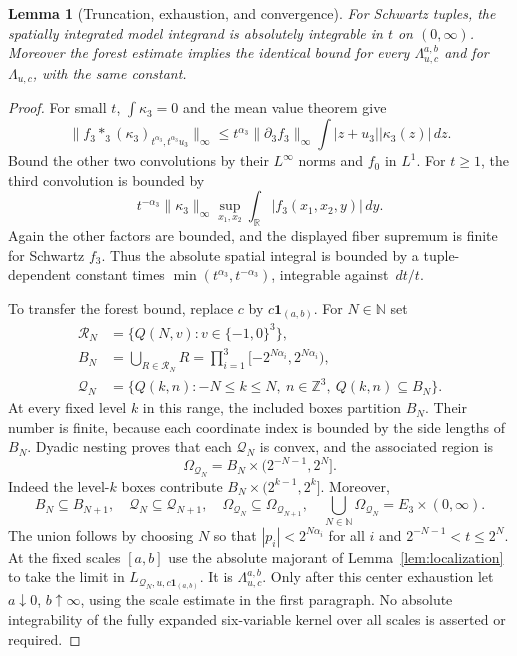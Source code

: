 \documentclass[12pt,reqno]{amsart}
\theoremstyle{plain}
\newtheorem{lemma}[theorem]{Lemma}
\theoremstyle{definition}
\theoremstyle{remark}
\numberwithin{equation}{section}
\newcommand{\R}{\mathbb R}
\newcommand{\N}{\mathbb N}
\newcommand{\Z}{\mathbb Z}
\newcommand{\dd}{\,d}
\newcommand{\one}{\mathbf 1}
\begin{document}
\begin{lemma}[Truncation, exhaustion, and convergence]\label{lem:model_convergence}
For Schwartz tuples, the spatially integrated model integrand is
absolutely integrable in $t$ on $(0,\infty)$. Moreover the forest
estimate implies the identical bound for every $\Lambda^{a,b}_{u,c}$
and for $\Lambda_{u,c}$, with the same constant.
\end{lemma}
\begin{proof}
For small $t$, $\int\kappa_3=0$ and the mean value theorem give
\[
 \|f_3*_3(\kappa_3)_{t^{\alpha_3},t^{\alpha_3}u_3}\|_\infty
 \le t^{\alpha_3}\|\partial_3f_3\|_\infty
             \int|z+u_3||\kappa_3(z)|\dd z.
\]
Bound the other two convolutions by their $L^\infty$ norms and
$f_0$ in $L^1$. For $t\ge1$, the third convolution is bounded by
\[
 t^{-\alpha_3}\|\kappa_3\|_\infty
       \sup_{x_1,x_2}\int_\R|f_3(x_1,x_2,y)|\dd y.
\]
Again the other factors are bounded, and the displayed fiber supremum
is finite for Schwartz $f_3$. Thus the absolute spatial integral is
bounded by a tuple-dependent constant times
$\min(t^{\alpha_3},t^{-\alpha_3})$, integrable against $\dd t/t$.

To transfer the forest bound, replace $c$ by $c\one_{(a,b)}$.
For $N\in\N$ set
\begin{align*}
 \mathcal R_N&=\{Q(N,v):v\in\{-1,0\}^3\},\\
 B_N&=\bigcup_{R\in\mathcal R_N}R
          =\prod_{i=1}^3[-2^{N\alpha_i},2^{N\alpha_i}),\\
 \mathcal Q_N&=\{Q(k,n):-N\le k\le N,\ n\in\Z^3,
                                      \ Q(k,n)\subseteq B_N\}.
\end{align*}
At every fixed level $k$ in this range, the included boxes partition
$B_N$. Their number is finite, because each coordinate index is
bounded by the side lengths of $B_N$. Dyadic nesting proves that
each $\mathcal Q_N$ is convex, and the associated region is
\[
 \Omega_{\mathcal Q_N}=B_N\times(2^{-N-1},2^N].
\]
Indeed the level-$k$ boxes contribute
$B_N\times(2^{k-1},2^k]$. Moreover,
\[
 B_N\subseteq B_{N+1},\quad
 \mathcal Q_N\subseteq\mathcal Q_{N+1},\quad
 \Omega_{\mathcal Q_N}\subseteq\Omega_{\mathcal Q_{N+1}},\quad
 \bigcup_{N\in\N}\Omega_{\mathcal Q_N}=E_3\times(0,\infty).
\]
The union follows by choosing $N$ so that
$|p_i|<2^{N\alpha_i}$ for all $i$ and $2^{-N-1}<t\le2^N$.
At the fixed scales $[a,b]$ use the
absolute majorant of Lemma~\ref{lem:localization} to take the limit
in $L_{\mathcal Q_N,u,c\one_{(a,b)}}$. It is $\Lambda^{a,b}_{u,c}$.
Only after this center exhaustion let $a\downarrow0$, $b\uparrow\infty$,
using the scale estimate in the first paragraph. No absolute
integrability of the fully expanded six-variable kernel over all
scales is asserted or required.
\end{proof}
\end{document}
